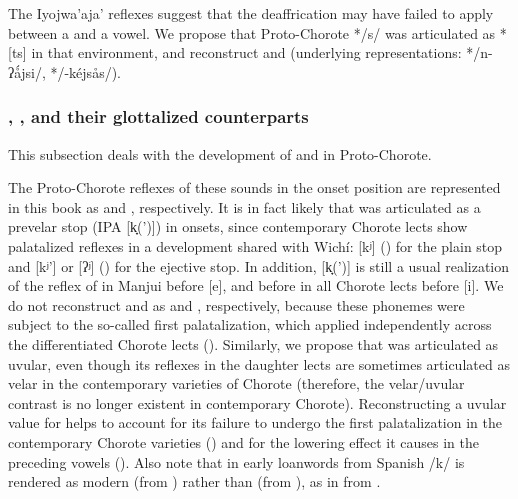 The Iyojwa'aja' reflexes suggest that the deaffrication may have failed to apply between a  and a vowel. We propose that Proto-Chorote */s/ was articulated as *[ts] in that environment, and reconstruct  and  (underlying representations: */n\mbox{-}ʔǻjsi/, */\mbox{-}kéjsås/).

\subsubsection{, , and their glottalized counterparts}\label{ch-k-q}

This subsection deals with the development of  and  in Proto-Chorote.

The Proto-Chorote reflexes of these sounds in the onset position are represented in this book as  and , respectively. It is in fact likely that  was articulated as a prevelar stop (IPA [k̟(’)]) in onsets, since contemporary Chorote lects show palatalized reflexes in a development shared with Wichí: [kʲ] () for the plain stop and [kʲ’] or [ʔʲ] () for the ejective stop. In addition, [k̟(’)] is still a usual realization of the reflex of  in Manjui before [e], and before in all Chorote lects before [i]. We do not reconstruct  and  as  and , respectively, because these phonemes were subject to the so-called first palatalization, which applied independently across the differentiated Chorote lects (). 
Similarly, we propose that  was articulated as uvular, even though its reflexes in the daughter lects are sometimes articulated as velar in the contemporary varieties of Chorote (therefore, the velar/uvular contrast is no longer existent in contemporary Chorote). Reconstructing a uvular value for  helps to account for its failure to undergo the first palatalization in the contemporary Chorote varieties () and for the lowering effect it causes in the preceding vowels (). Also note that in early loanwords from Spanish /k/ is rendered as modern  (from ) rather than  (from ), as in  from  \citep[101, fn. 37]{JC14b}.

